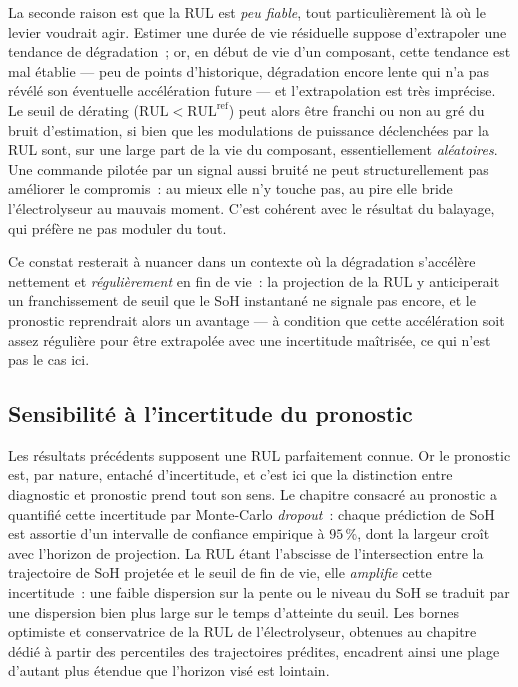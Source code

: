 La seconde raison est que la RUL est \emph{peu fiable}, tout particulièrement là où le levier voudrait agir. Estimer une durée de vie résiduelle suppose d'extrapoler une tendance de dégradation~; or, en début de vie d'un composant, cette tendance est mal établie — peu de points d'historique, dégradation encore lente qui n'a pas révélé son éventuelle accélération future — et l'extrapolation est très imprécise. Le seuil de dérating ($\mathrm{RUL} < \mathrm{RUL}^{\text{ref}}$) peut alors être franchi ou non au gré du bruit d'estimation, si bien que les modulations de puissance déclenchées par la RUL sont, sur une large part de la vie du composant, essentiellement \emph{aléatoires}. Une commande pilotée par un signal aussi bruité ne peut structurellement pas améliorer le compromis~: au mieux elle n'y touche pas, au pire elle bride l'électrolyseur au mauvais moment. C'est cohérent avec le résultat du balayage, qui préfère ne pas moduler du tout.

Ce constat resterait à nuancer dans un contexte où la dégradation s'accélère nettement et \emph{régulièrement} en fin de vie~: la projection de la RUL y anticiperait un franchissement de seuil que le SoH instantané ne signale pas encore, et le pronostic reprendrait alors un avantage — à condition que cette accélération soit assez régulière pour être extrapolée avec une incertitude maîtrisée, ce qui n'est pas le cas ici.

\subsection{Sensibilité à l'incertitude du pronostic}
\label{subsec:rb2rul_uncertainty}

Les résultats précédents supposent une RUL parfaitement connue. Or le pronostic est, par nature, entaché d'incertitude, et c'est ici que la distinction entre diagnostic et pronostic prend tout son sens. Le chapitre consacré au pronostic a quantifié cette incertitude par Monte-Carlo \textit{dropout}~: chaque prédiction de SoH est assortie d'un intervalle de confiance empirique à $95\,\%$, dont la largeur croît avec l'horizon de projection. La RUL étant l'abscisse de l'intersection entre la trajectoire de SoH projetée et le seuil de fin de vie, elle \emph{amplifie} cette incertitude~: une faible dispersion sur la pente ou le niveau du SoH se traduit par une dispersion bien plus large sur le temps d'atteinte du seuil. Les bornes optimiste et conservatrice de la RUL de l'électrolyseur, obtenues au chapitre dédié à partir des percentiles des trajectoires prédites, encadrent ainsi une plage d'autant plus étendue que l'horizon visé est lointain.

